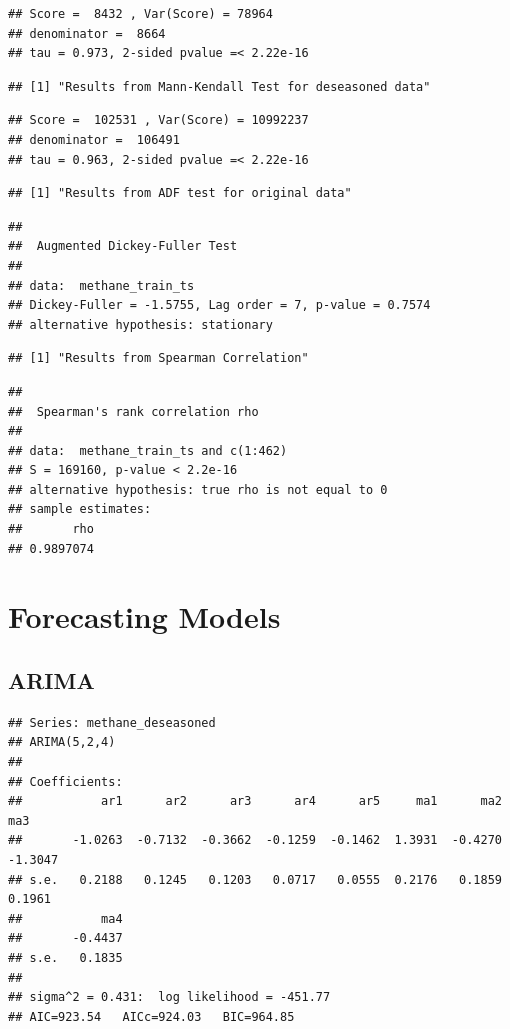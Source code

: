 \documentclass[
]{article}
\begin{document}
\begin{verbatim}
## Score =  8432 , Var(Score) = 78964
## denominator =  8664
## tau = 0.973, 2-sided pvalue =< 2.22e-16
\end{verbatim}

\begin{verbatim}
## [1] "Results from Mann-Kendall Test for deseasoned data"
\end{verbatim}

\begin{verbatim}
## Score =  102531 , Var(Score) = 10992237
## denominator =  106491
## tau = 0.963, 2-sided pvalue =< 2.22e-16
\end{verbatim}

\begin{verbatim}
## [1] "Results from ADF test for original data"
\end{verbatim}

\begin{verbatim}
## 
##  Augmented Dickey-Fuller Test
## 
## data:  methane_train_ts
## Dickey-Fuller = -1.5755, Lag order = 7, p-value = 0.7574
## alternative hypothesis: stationary
\end{verbatim}

\begin{verbatim}
## [1] "Results from Spearman Correlation"
\end{verbatim}

\begin{verbatim}
## 
##  Spearman's rank correlation rho
## 
## data:  methane_train_ts and c(1:462)
## S = 169160, p-value < 2.2e-16
## alternative hypothesis: true rho is not equal to 0
## sample estimates:
##       rho 
## 0.9897074
\end{verbatim}

\section{Forecasting Models}\label{forecasting-models}

\subsection{ARIMA}\label{arima}

\begin{verbatim}
## Series: methane_deseasoned 
## ARIMA(5,2,4) 
## 
## Coefficients:
##           ar1      ar2      ar3      ar4      ar5     ma1      ma2      ma3
##       -1.0263  -0.7132  -0.3662  -0.1259  -0.1462  1.3931  -0.4270  -1.3047
## s.e.   0.2188   0.1245   0.1203   0.0717   0.0555  0.2176   0.1859   0.1961
##           ma4
##       -0.4437
## s.e.   0.1835
## 
## sigma^2 = 0.431:  log likelihood = -451.77
## AIC=923.54   AICc=924.03   BIC=964.85
\end{verbatim}
\end{document}
